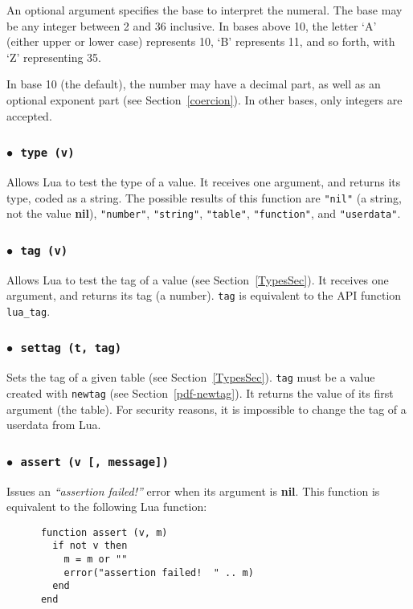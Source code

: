 \documentclass[11pt]{article}
\newcommand{\See}[1]{Section~\ref{#1}}
\newcommand{\see}[1]{(see \See{#1})}
\newcommand{\T}[1]{{\tt #1}}
\newcommand{\nil}{{\bf nil}}
\newcommand{\Deffunc}[1]{\index{#1}}
\newcommand{\ff}{$\bullet$\ }
\begin{document}
An optional argument specifies the base to interpret the numeral.
The base may be any integer between 2 and 36 inclusive.
In bases above  10, the letter `A' (either upper or lower case)
represents 10, `B' represents 11, and so forth, with `Z' representing 35.

In base 10 (the default), the number may have a decimal part,
as well as an optional exponent part \see{coercion}.
In other bases, only integers are accepted.

\subsubsection*{\ff \T{type (v)}}\Deffunc{type}\label{pdf-type}
Allows Lua to test the type of a value.
It receives one argument, and returns its type, coded as a string.
The possible results of this function are
\verb|"nil"| (a string, not the value \nil),
\verb|"number"|,
\verb|"string"|,
\verb|"table"|,
\verb|"function"|,
and \verb|"userdata"|.

\subsubsection*{\ff \T{tag (v)}}\Deffunc{tag}
Allows Lua to test the tag of a value \see{TypesSec}.
It receives one argument, and returns its tag (a number).
\verb|tag| is equivalent to the API function \verb|lua_tag|.

\subsubsection*{\ff \T{settag (t, tag)}}\Deffunc{settag}
Sets the tag of a given table \see{TypesSec}.
\verb|tag| must be a value created with \verb|newtag|
\see{pdf-newtag}.
It returns the value of its first argument (the table).
For security reasons,
it is impossible to change the tag of a userdata from Lua.


\subsubsection*{\ff \T{assert (v [, message])}}\Deffunc{assert}
Issues an \emph{``assertion failed!''} error
when its argument is \nil.
This function is equivalent to the following Lua function:
\begin{verbatim}
      function assert (v, m)
        if not v then
          m = m or ""
          error("assertion failed!  " .. m)
        end
      end
\end{verbatim}
\end{document}
